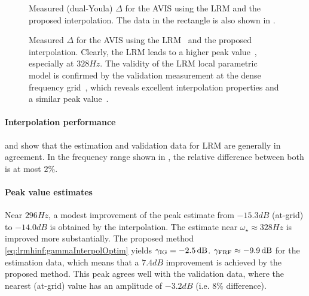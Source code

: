 \begin{figure}[p]
 \centering
    \setlength{\figurewidth}{0.7\columnwidth}
    \setlength{\figureheight}{0.68\figurewidth}
    
 \caption[$\Delta$ of the , estimated using local modeling.]{Measured (dual-Youla) $\Delta$ for the \gls{AVIS} using the \gls{LRM} and the proposed interpolation. The data in the rectangle is also shown in .}
\label{fig:lrmhinf:avisMeas}
\end{figure}

\begin{figure}[p]
 \centering
    \setlength{\figurewidth}{0.7\columnwidth}
    \setlength{\figureheight}{0.68\figurewidth}
   
 \caption[$\Delta$ of the , estimated using local modeling (detail).]{Measured $\Delta$ for the \gls{AVIS} using the \gls{LRM}~ and the proposed interpolation. Clearly, the \gls{LRM} leads to a higher peak value~, especially at $328\unit{Hz}$. The validity of the LRM local parametric model is confirmed by the validation measurement at the dense frequency grid~, which reveals excellent interpolation properties and a similar peak value~.}
\label{fig:lrmhinf:avisMeasZoom}
\end{figure}

\paragraph*{Interpolation performance}
\label{sec:lrmhinf:avis-interpol}
 and  show that the estimation and validation data for \gls{LRM} are generally in agreement.
In the frequency range shown in , the relative difference between both is at most $2\%$.

\paragraph*{Peak value estimates}
\label{sec:lrmhinf:avis-peak-value}
Near $296\unit{Hz}$, a modest improvement of the peak estimate from $-15.3 \unit{dB}$ (at-grid) to $-14.0 \unit{dB}$ is obtained by the interpolation.
The estimate near $\omega_{\star} \approx 328\unit{Hz}$ is improved more substantially.
The proposed method \eqref{eq:lrmhinf:gammaInterpolOptim} yields $\gamma_{\mathrm{IG}}=-2.5\,\mathrm{dB}$.
$\gamma_{\mathrm{FRF}}\approx -9.9\,\mathrm{dB}$ for the estimation data, which means that a $7.4\unit{dB}$ improvement is achieved by the proposed method.
This peak agrees well with the validation data, where the nearest (at-grid) value has an amplitude of $-3.2\unit{dB}$ (i.e. $8\%$ difference).

